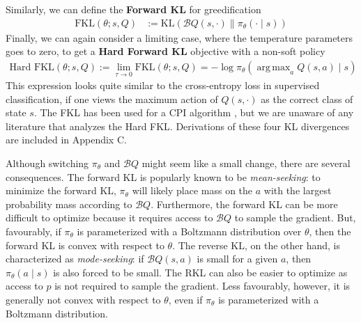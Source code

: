 \documentclass[twoside,11pt]{article}
\DeclareMathOperator*{\argmax}{arg\,max}
\newcommand{\actionspace}{\mathcal{A}}
\newcommand{\Qhat}{{Q}}
\newcommand{\KL}{\mathrm{KL}}
\newcommand{\policyparams}{\theta}
\newcommand{\boltzmannQ}{\mathcal{B}Q}
\newcommand{\entropy}{\mathcal{H}}
\newcommand{\defeq}{:=}
\begin{document}
Similarly, we can define the \textbf{Forward KL} for greedification %
%
\begin{align}
\text{FKL}(\policyparams; s, \Qhat) &\defeq  %
    \KL\left(\boltzmannQ(s, \cdot)  \parallel \pi_\policyparams(\cdot \mid s) \right)\nonumber%
\end{align}
Finally, we can again consider a limiting case, where the temperature parameters goes to zero, to get a \textbf{Hard Forward KL} objective with a non-soft policy
%
\begin{align}
  \text{Hard FKL}(\policyparams; s, \Qhat) \defeq  \lim_{\tau \to 0} \text{FKL}(\policyparams; s, \Qhat) = -\log \pi_\policyparams(\argmax_a Q(s, a) \mid s)
\end{align}
%
This expression looks quite similar to the cross-entropy loss in supervised classification, if one views the maximum action of $Q(s, \cdot)$ as the correct class of state $s$. The FKL has been used for a CPI algorithm \citep{vieillard2019deep}, but we are unaware of any literature that analyzes the Hard FKL. Derivations of these four KL divergences are included in Appendix C.

Although switching $\pi_\policyparams$ and $\boltzmannQ$ might seem like a small change, there are several consequences. The forward KL is popularly known to be \textit{mean-seeking}: to minimize the forward KL, $\pi_\policyparams$ will likely place mass on the $a$ with the largest probability mass according to $\boltzmannQ$. Furthermore, the forward KL can be more difficult to optimize because it requires access to $\boltzmannQ$ to sample the gradient. But, favourably, if $\pi_\theta$ is parameterized with a Boltzmann distribution over $\theta$, then the forward KL is convex with respect to $\theta$. The reverse KL, on the other hand, is characterized as \textit{mode-seeking}: if $\boltzmannQ(s, a)$ is small for a given $a$, then $\pi_\theta(a \mid s)$ is also forced to be small. The RKL can also be easier to optimize as access to $p$ is not required to sample the gradient. Less favourably, however, it is generally not convex with respect to $\theta$, even if $\pi_\theta$ is parameterized with a Boltzmann distribution. 
\end{document}
